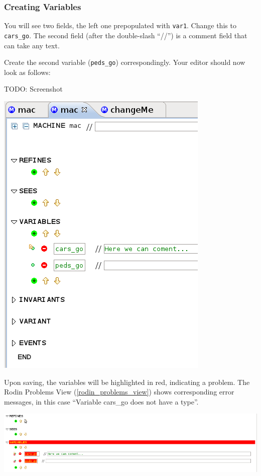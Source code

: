 \subsubsection{Creating Variables}

You will see two fields, the left one prepopulated with \texttt{var1}.  Change this to \texttt{cars\_go}.  The second field (after the double-slash ``//'') is a comment field that can take any text.


Create the second variable (\texttt{peds\_go}) correspondingly.  Your editor should now look as follows:

TODO: Screenshot
\begin{center}
	\includegraphics[]{img/tutorial/new-variable.png}
\end{center}

Upon saving, the variables will be highlighted in red, indicating a problem.  The \textsf{Rodin Problems} View (\ref{rodin_problems_view}) shows corresponding error messages, in this case ``Variable cars\_go does not have a type''.
\begin{center}
	\includegraphics[]{img/tutorial/error.png}
\end{center}


